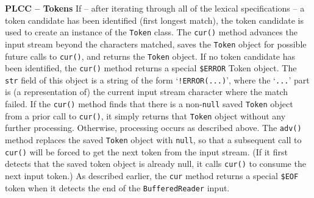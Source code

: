\begin{minipage}[t]{\sw}
\slidenumber
\LARGE
{\bf PLCC -- Tokens}\exx
If -- after iterating through all of the lexical specifications --
a token candidate has been identified (first longest match),
the token candidate is used 
to create an instance of the \verb'Token' class.
The \verb'cur()' method advances the input stream
beyond the characters matched,
saves the \verb'Token' object for possible future calls to \verb'cur()',
and returns the \verb'Token' object.
If no token candidate has been identified,
the \verb'cur()' method returns a special \verb'$ERROR' Token object.
The \verb'str' field of this object is a string
of the form `\verb'!ERROR(...)'',
where the `\verb'...'' part is (a representation of)
the current input stream character where the match failed.\exx
If the \verb'cur()' method finds that there is
a non-\verb'null' saved \verb'Token' object from a prior call to \verb'cur()',
it simply returns that \verb'Token' object without any further processing.
Otherwise, processing occurs as described above.\exx
The \verb'adv()' method replaces
the saved \verb'Token' object with \verb'null',
so that a subsequent call to \verb'cur()' will be forced
to get the next token from the input stream.
(If it first detects that the saved token object is already null,
it calls \verb'cur()' to consume the next input token.)\exx
As described earlier, the \verb'cur' method returns a special
\verb'$EOF' token when it detects the end
of the \verb'BufferedReader' input.
\end{minipage}
\clearpage
